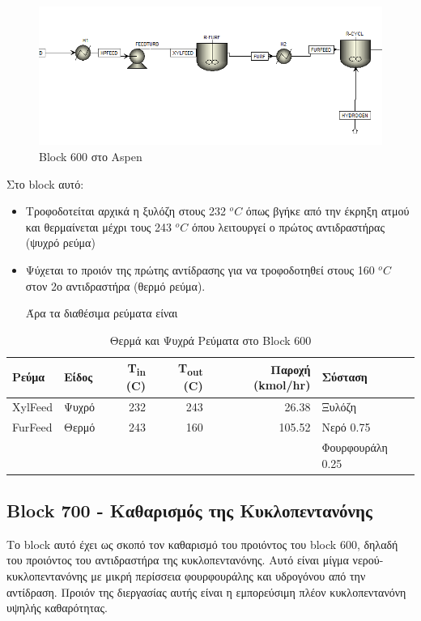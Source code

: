 \documentclass[11pt]{article}
\begin{document}
\begin{figure}[htbp]
\centering
\includegraphics[width=.9\linewidth]{Block_600_-_Παραγωγή_Κυκλοπεντανόνης_με_την_Φουρφουράλη_ως_Ενδιάμεσο/2023-03-11_17-58-53_screenshot.png}
\caption{Block 600 στο Aspen}
\end{figure}

Στο block αυτό:
\begin{itemize}
\item Τροφοδοτείται αρχικά η ξυλόζη στους 232 \(^oC\) όπως βγήκε από την έκρηξη ατμού και θερμαίνεται μέχρι τους 243 \(^oC\) όπου λειτουργεί ο πρώτος αντιδραστήρας (ψυχρό ρεύμα)
\item Ψύχεται το προιόν της πρώτης αντίδρασης για να τροφοδοτηθεί στους 160 \(^oC\) στον 2ο αντιδραστήρα (θερμό ρεύμα).

Άρα τα διαθέσιμα ρεύματα είναι
\end{itemize}
\begin{table}[htbp]
\caption{Θερμά και Ψυχρά Ρεύματα στο Block 600}
\centering
\begin{tabular}{llrrrl}
Ρεύμα & Είδος & Τ\textsubscript{in} (C) & Τ\textsubscript{out} (C) & Παροχή (kmol/hr) & Σύσταση\\
\hline
XylFeed & Ψυχρό & 232 & 243 & 26.38 & Ξυλόζη\\
\hline
FurFeed & Θερμό & 243 & 160 & 105.52 & Νερό 0.75\\
 &  &  &  &  & Φουρφουράλη 0.25\\
\hline
\end{tabular}
\end{table}

\subsection{Block 700 - Καθαρισμός της Κυκλοπεντανόνης}
\label{sec:org9570105}
Το block αυτό έχει ως σκοπό τον καθαρισμό του προιόντος του block 600, δηλαδή του προιόντος του αντιδραστήρα της κυκλοπεντανόνης. Αυτό είναι μίγμα νερού-κυκλοπεντανόνης με μικρή περίσσεια φουρφουράλης και υδρογόνου από την αντίδραση. Προιόν της διεργασίας αυτής είναι η εμπορεύσιμη πλέον κυκλοπεντανόνη υψηλής καθαρότητας.
\end{document}
